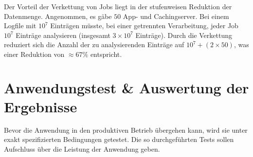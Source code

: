 \newpage
Der Vorteil der Verkettung von Jobs liegt in der stufenweisen Reduktion der Datenmenge. Angenommen, es gäbe $50$ App- und Cachingserver. Bei einem Logfile mit $10^7$ Einträgen müsste, bei einer getrennten Verarbeitung, jeder Job $10^7$ Einträge analysieren (insgesamt $3 \times 10^7$ Einträge). Durch die Verkettung reduziert sich die Anzahl der zu analysierenden Einträge auf $10^7+ (2 \times 50)$, was einer Reduktion von $\approx 67\%$ entspricht.





\section{Anwendungstest \& Auswertung der Ergebnisse}
Bevor die Anwendung in den produktiven Betrieb übergehen kann, wird sie unter exakt spezifizierten Bedingungen getestet. Die so durchgeführten Tests sollen Aufschluss über die Leistung der Anwendung geben.

